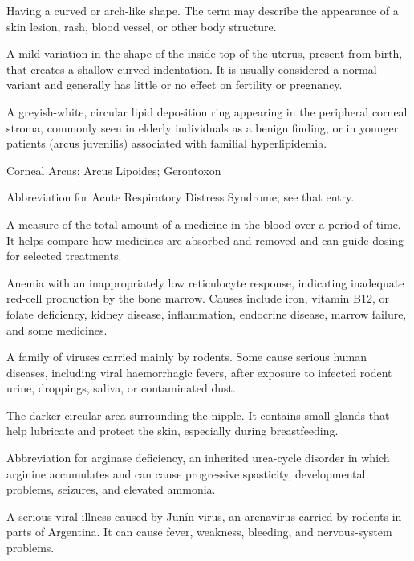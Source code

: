  Having a curved or arch-like shape. The term may describe the appearance of a skin lesion, rash, blood vessel, or other body structure.

 A mild variation in the shape of the inside top of the uterus, present from birth, that creates a shallow curved indentation. It is usually considered a normal variant and generally has little or no effect on fertility or pregnancy.

 A greyish-white, circular lipid deposition ring appearing in the peripheral corneal stroma, commonly seen in elderly individuals as a benign finding, or in younger patients (arcus juvenilis) associated with familial hyperlipidemia.

\synonyms
Corneal Arcus; Arcus Lipoides; Gerontoxon

 Abbreviation for Acute Respiratory Distress Syndrome; see that entry.

 A measure of the total amount of a medicine in the blood over a period of time. It helps compare how medicines are absorbed and removed and can guide dosing for selected treatments.

 Anemia with an inappropriately low reticulocyte response, indicating inadequate red-cell production by the bone marrow. Causes include iron, vitamin B12, or folate deficiency, kidney disease, inflammation, endocrine disease, marrow failure, and some medicines.

 A family of viruses carried mainly by rodents. Some cause serious human diseases, including viral haemorrhagic fevers, after exposure to infected rodent urine, droppings, saliva, or contaminated dust.

 The darker circular area surrounding the nipple. It contains small glands that help lubricate and protect the skin, especially during breastfeeding.

 Abbreviation for arginase deficiency, an inherited urea-cycle disorder in which arginine accumulates and can cause progressive spasticity, developmental problems, seizures, and elevated ammonia.

 A serious viral illness caused by Junín virus, an arenavirus carried by rodents in parts of Argentina. It can cause fever, weakness, bleeding, and nervous-system problems.

